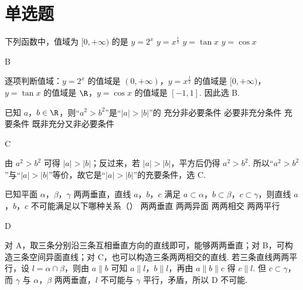 \section{单选题}

\begin{problem}
下列函数中，值域为 \([0,+\infty)\) 的是
\choices
    {\(y=2^x\)}
    {\(y=x^{\frac{1}{2}}\)}
    {\(y=\tan x\)}
    {\(y=\cos x\)}
\end{problem}

\begin{answer}
B
\end{answer}

\begin{solution}
逐项判断值域：\(y=2^x\) 的值域是 \((0,+\infty)\)，\(y=x^{\frac{1}{2}}\) 的值域是 \([0,+\infty)\)，\(y=\tan x\) 的值域是 \(\R\)，\(y=\cos x\) 的值域是 \([-1,1]\). 因此选 B.
\end{solution}

\begin{problem}
已知 \(a\)，\(b\in\R\)，则“\(a^2>b^2\)”是“\(|a|>|b|\)”的
\choices
    {充分非必要条件}
    {必要非充分条件}
    {充要条件}
    {既非充分又非必要条件}
\end{problem}

\begin{answer}
C
\end{answer}

\begin{solution}
由 \(a^2>b^2\) 可得 \(|a|>|b|\)；反过来，若 \(|a|>|b|\)，平方后仍得 \(a^2>b^2\). 所以“\(a^2>b^2\)”与“\(|a|>|b|\)”等价，故它是“\(|a|>|b|\)”的充要条件，选 C.
\end{solution}

\begin{problem}
已知平面 \(\alpha\)，\(\beta\)，\(\gamma\) 两两垂直，直线 \(a\)，\(b\)，\(c\) 满足 \(a\subset\alpha\)，\(b\subset\beta\)，\(c\subset\gamma\)，则直线 \(a\)，\(b\)，\(c\) 不可能满足以下哪种关系（\quad）
\choices
    {两两垂直}
    {两两异面}
    {两两相交}
    {两两平行}
\end{problem}

\begin{answer}
D
\end{answer}

\begin{solution}
对 A，取三条分别沿三条互相垂直方向的直线即可，能够两两垂直；对 B，可构造三条空间异面直线；对 C，也可以构造三条两两相交的直线. 若三条直线两两平行，设 \(l=\alpha\cap\beta\)，则由 \(a\parallel b\) 可知 \(a\parallel l\)，\(b\parallel l\)，再由 \(a\parallel b\parallel c\) 得 \(c\parallel l\). 但 \(c\subset\gamma\)，而 \(\gamma\) 与 \(\alpha\)，\(\beta\) 两两垂直，\(l\) 不可能与 \(\gamma\) 平行，矛盾，所以 D 不可能.
\end{solution}

